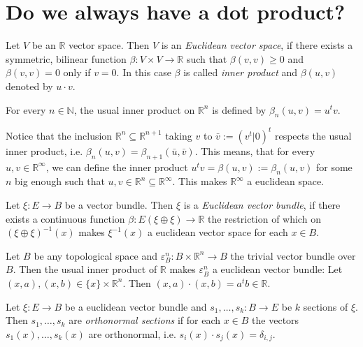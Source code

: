 \section{Do we always have a dot product?}
\begin{definition} Let $V$ be an $\mathbb{R}$ vector space. Then $V$ is an \emph{Euclidean vector space}, if there exists a symmetric, bilinear function $\beta:V\times V\to\mathbb{R}$ such that $\beta(v,v)\geq0$ and $\beta(v,v)=0$ only if $v=0$. In this case $\beta$ is called \emph{inner product} and $\beta(u,v)$ denoted by $u\cdot v$.
\end{definition}

\begin{examples}\label{ex:infinite_euclidean_space}
\begin{i_enum}\item For every $n\in\mathbb{N}$, the usual inner product on $\mathbb{R}^n$ is defined by $\beta_n(u,v)=u^tv$.
\item Notice that the inclusion $\mathbb{R}^n\subseteq\mathbb{R}^{n+1}$ taking $v$ to $\bar{v}:=(v^t|0)^t$ respects the usual inner product, i.e. $\beta_n(u,v)=\beta_{n+1}(\bar{u},\bar{v})$. This means, that for every $u,v\in\mathbb{R}^{\infty}$, we can define the inner product $u^tv=\beta(u,v):=\beta_n(u,v)$ for some $n$ big enough such that $u,v\in\mathbb{R}^n\subseteq\mathbb{R}^{\infty}$. This makes $\mathbb{R}^{\infty}$ a euclidean space.
\end{i_enum}
\end{examples}

\begin{definition} Let $\xi:E\to B$ be a vector bundle. Then $\xi$ is a \emph{Euclidean vector bundle}, if there exists a continuous function $\beta:E(\xi\oplus\xi)\to\mathbb{R}$ the restriction of which on $(\xi\oplus\xi)^{-1}(x)$ makes $\xi^{-1}(x)$ a euclidean vector space for each $x\in B$.
\end{definition}

\begin{example} Let $B$ be any topological space and $\varepsilon_B^n:B\times\mathbb{R}^n\to B$ the trivial vector bundle over $B$. Then the usual inner product of $\mathbb{R}$ makes $\varepsilon_B^n$ a euclidean vector bundle: Let $(x,a),(x,b)\in\{x\}\times\mathbb{R}^n$. Then $(x,a)\cdot(x,b)=a^tb\in\mathbb{R}$.
\end{example}

\begin{definition} Let $\xi:E\to B$ be a euclidean vector bundle and $s_1,\ldots,s_k:B\to E$ be $k$ sections of $\xi$. Then $s_1,\ldots,s_k$ are \emph{orthonormal sections} if for each $x\in B$ the vectors $s_1(x),\ldots,s_k(x)$ are orthonormal, i.e. $s_i(x)\cdot s_j(x)=\delta_{i,j}$.
\end{definition}

